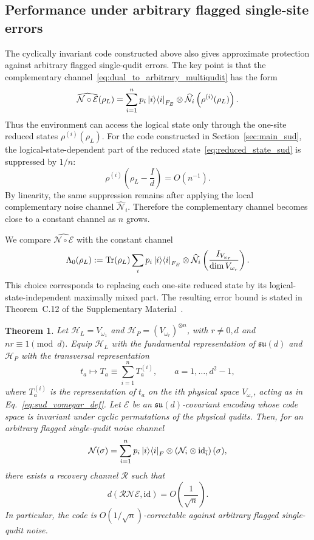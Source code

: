 \documentclass[10pt,twocolumn,superscriptaddress,aps,amsmath,amssymb,citeautoscript,floatfix,prx,longbibliography]{revtex4-2}
\newtheorem{theorem}{Theorem}
\theoremstyle{plain}
\theoremstyle{plain}
\theoremstyle{plain}
\theoremstyle{plain}
\theoremstyle{plain}
\theoremstyle{plain}
\begin{document}
\subsection{Performance under arbitrary flagged single-site errors}\label{subsec:main_arb_noise}

The cyclically invariant code constructed above also gives approximate protection against arbitrary flagged single-qudit errors. The key point is that the complementary channel~\eqref{eq:dual_to_arbitrary_multiqudit} has the form
$$
    \widehat{\mathcal N\circ\mathcal E}(\rho_L)
    =
    \sum_{i=1}^n
    p_i\ket i\!\bra i_{F_E}
    \otimes
    \widehat{\mathcal N}_i
    \left(\rho^{(i)}(\rho_L)\right).
$$
Thus the environment can access the logical state only through the one-site reduced states $\rho^{(i)}(\rho_L)$. For the code constructed in Section~\ref{sec:main_sud}, the logical-state-dependent part of the reduced state~\eqref{eq:reduced_state_sud} is suppressed by $1/n$:
$$
    \rho^{(i)}
    \left(
        \rho_L-\frac{I}{d}
    \right)
    =
    O(n^{-1}) .
$$
By linearity, the same suppression remains after applying the local complementary noise channel $\widehat{\mathcal N}_i$. Therefore the complementary channel becomes close to a constant channel as $n$ grows.

We compare $\widehat{\mathcal N\circ\mathcal E}$ with the constant channel
$$
    \Lambda_0(\rho_L)
    :=
    \operatorname{Tr}(\rho_L)
    \sum_i
    p_i\ket i\!\bra i_{F_E}
    \otimes
    \widehat{\mathcal N}_i
    \left(
        \frac{I_{V_{\omega_r}}}{\dim V_{\omega_r}}
    \right).
$$
This choice corresponds to replacing each one-site reduced state by its logical-state-independent maximally mixed part. The resulting error bound is stated in Theorem~C.12 of the Supplementary Material~\cite{SuppMat}.

\begin{theorem}
Let $\mathcal H_L=V_{\omega_1}$ and $\mathcal H_P=(V_{\omega_r})^{\otimes n}$, with $r\neq 0,d$ and $nr\equiv 1\pmod d$. Equip $\mathcal H_L$ with the fundamental representation of $\mathfrak{su}(d)$ and $\mathcal H_P$ with the transversal representation
$$
    t_a
    \longmapsto
    T_a
    \equiv
    \sum_{i=1}^n T_a^{(i)},
    \qquad
    a=1,\ldots,d^2-1,
$$
where $T_a^{(i)}$ is the representation of $t_a$ on the $i$th physical space $V_{\omega_r}$, acting as in Eq.~\eqref{eq:sud_vomegar_def}. Let $\mathcal E$ be an $\mathfrak{su}(d)$-covariant encoding whose code space is invariant under cyclic permutations of the physical qudits. Then, for an arbitrary flagged single-qudit noise channel
$$
    \mathcal N(\sigma)
    =
    \sum_{i=1}^n
    p_i\ket i\!\bra i_F
    \otimes
    \left(
        \mathcal N_i\otimes\mathrm{id}_{\bar i}
    \right)(\sigma),
$$
there exists a recovery channel $\mathcal R$ such that
$$
    d(\mathcal R\mathcal N\mathcal E,\mathrm{id})
    =
    O\left(\frac{1}{\sqrt n}\right).
$$
In particular, the code is $O(1/\sqrt n)$-correctable against arbitrary flagged single-qudit noise.
\end{theorem}
\end{document}
